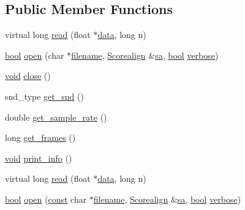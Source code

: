\subsection*{Public Member Functions}
\begin{DoxyCompactItemize}
\item 
virtual long \hyperlink{class_audio__file__reader_a2e3c1765d7c0693d82cc0c9b4e802661}{read} (float $\ast$\hyperlink{lib_2expat_8h_ac39e72a1de1cb50dbdc54b08d0432a24}{data}, long n)
\item 
\hyperlink{mac_2config_2i386_2lib-src_2libsoxr_2soxr-config_8h_abb452686968e48b67397da5f97445f5b}{bool} \hyperlink{class_audio__file__reader_a91bd10ffab77fa9fa58224171aa805d5}{open} (char $\ast$\hyperlink{test__portburn_8cpp_a7efa5e9c7494c7d4586359300221aa5d}{filename}, \hyperlink{class_scorealign}{Scorealign} \&\hyperlink{lib-src_2libscorealign_2main_8cpp_a1aa9083626d69f94349750d974f0359a}{sa}, \hyperlink{mac_2config_2i386_2lib-src_2libsoxr_2soxr-config_8h_abb452686968e48b67397da5f97445f5b}{bool} \hyperlink{mm_8c_ab421ea2a103f8a57c338dc30e3cf4f6b}{verbose})
\item 
\hyperlink{sound_8c_ae35f5844602719cf66324f4de2a658b3}{void} \hyperlink{class_audio__file__reader_aec7170b0fa8d0d41a7f3251ab6cbbf37}{close} ()
\item 
snd\+\_\+type \hyperlink{class_audio__file__reader_a3fd69930035e0d55ca54c00788a51ae8}{get\+\_\+snd} ()
\item 
double \hyperlink{class_audio__file__reader_aaabf69bfa40d71459577eeaee049b78c}{get\+\_\+sample\+\_\+rate} ()
\item 
long \hyperlink{class_audio__file__reader_aa2f1a8ca4f0f22c5ba22383ef5edf383}{get\+\_\+frames} ()
\item 
\hyperlink{sound_8c_ae35f5844602719cf66324f4de2a658b3}{void} \hyperlink{class_audio__file__reader_a621f6c2b9488d30b7c6bf51b6c67ffde}{print\+\_\+info} ()
\item 
virtual long \hyperlink{class_audio__file__reader_a5c995434701eda3643171fb0374f3fba}{read} (float $\ast$\hyperlink{lib_2expat_8h_ac39e72a1de1cb50dbdc54b08d0432a24}{data}, long n)
\item 
\hyperlink{mac_2config_2i386_2lib-src_2libsoxr_2soxr-config_8h_abb452686968e48b67397da5f97445f5b}{bool} \hyperlink{class_audio__file__reader_aae880b83dac9a36f9b8c8431cf8c4976}{open} (\hyperlink{getopt1_8c_a2c212835823e3c54a8ab6d95c652660e}{const} char $\ast$\hyperlink{test__portburn_8cpp_a7efa5e9c7494c7d4586359300221aa5d}{filename}, \hyperlink{class_scorealign}{Scorealign} \&\hyperlink{lib-src_2libscorealign_2main_8cpp_a1aa9083626d69f94349750d974f0359a}{sa}, \hyperlink{mac_2config_2i386_2lib-src_2libsoxr_2soxr-config_8h_abb452686968e48b67397da5f97445f5b}{bool} \hyperlink{mm_8c_ab421ea2a103f8a57c338dc30e3cf4f6b}{verbose})

\end{DoxyCompactItemize}
